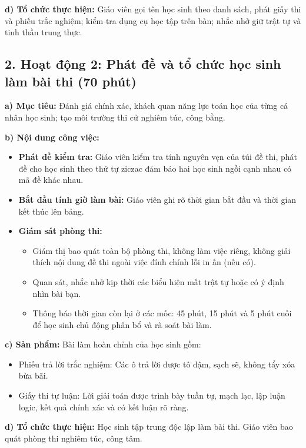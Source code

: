 \documentclass[12pt, a4paper]{article}
\begin{document}
\noindent \textbf{d) Tổ chức thực hiện:}
Giáo viên gọi tên học sinh theo danh sách, phát giấy thi và phiếu trắc nghiệm; kiểm tra dụng cụ học tập trên bàn; nhắc nhở giữ trật tự và tinh thần trung thực.

\subsection*{2. Hoạt động 2: Phát đề và tổ chức học sinh làm bài thi (70 phút)}

\noindent \textbf{a) Mục tiêu:}
Đánh giá chính xác, khách quan năng lực toán học của từng cá nhân học sinh; tạo môi trường thi cử nghiêm túc, công bằng.

\noindent \textbf{b) Nội dung công việc:}
\begin{itemize}[leftmargin=0.8cm]
    \item \textbf{Phát đề kiểm tra:} Giáo viên kiểm tra tính nguyên vẹn của túi đề thi, phát đề cho học sinh theo thứ tự ziczac đảm bảo hai học sinh ngồi cạnh nhau có mã đề khác nhau.
    \item \textbf{Bắt đầu tính giờ làm bài:} Giáo viên ghi rõ thời gian bắt đầu và thời gian kết thúc lên bảng.
    \item \textbf{Giám sát phòng thi:}
    \begin{itemize}
        \item Giám thị bao quát toàn bộ phòng thi, không làm việc riêng, không giải thích nội dung đề thi ngoài việc đính chính lỗi in ấn (nếu có).
        \item Quan sát, nhắc nhở kịp thời các biểu hiện mất trật tự hoặc có ý định nhìn bài bạn.
        \item Thông báo thời gian còn lại ở các mốc: 45 phút, 15 phút và 5 phút cuối để học sinh chủ động phân bổ và rà soát bài làm.
    \end{itemize}
\end{itemize}

\noindent \textbf{c) Sản phẩm:}
Bài làm hoàn chỉnh của học sinh gồm:
\begin{itemize}[leftmargin=0.6cm]
    \item Phiếu trả lời trắc nghiệm: Các ô trả lời được tô đậm, sạch sẽ, không tẩy xóa bừa bãi.
    \item Giấy thi tự luận: Lời giải toán được trình bày tuần tự, mạch lạc, lập luận logic, kết quả chính xác và có kết luận rõ ràng.
\end{itemize}

\noindent \textbf{d) Tổ chức thực hiện:}
Học sinh tập trung độc lập làm bài thi. Giáo viên bao quát phòng thi nghiêm túc, công tâm.
\end{document}
